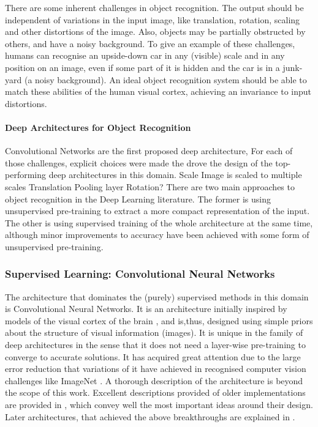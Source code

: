 \documentclass[a4paper]{report}
\begin{document}
		There are some inherent challenges in object recognition. The output should be independent of variations in the input image, like translation, rotation, scaling and other distortions of the image. Also, objects may be partially obstructed by others, and have a noisy background. To give an example of these challenges, humans can recognise an upside-down car in any (visible) scale and in any position on an image, even if some part of it is hidden and the car is in a junk-yard (a noisy background). An ideal object recognition system should be able to match these abilities of the human visual cortex, achieving an invariance to input distortions. 
		
		\paragraph{Deep Architectures for Object Recognition}
		Convolutional Networks are the first proposed deep architecture,
		For each of those challenges, explicit choices were made the drove the design of the top-performing deep architectures in this domain.
		Scale
			Image is scaled to multiple scales
		Translation
			Pooling layer
		Rotation?
		There are two main approaches to object recognition in the Deep Learning literature. The former is using unsupervised pre-training to extract a more compact representation of the input. The other is using supervised training of the whole architecture at the same time, although minor improvements to accuracy have been achieved with some form of unsupervised pre-training.
		\subsubsection{Supervised Learning: Convolutional Neural Networks}			
			The architecture that dominates the (purely) supervised methods in this domain is Convolutional Neural Networks. It is an architecture initially inspired by models of the visual cortex of the brain \cite{Fukushima1980}, and is,thus, designed using simple priors about the structure of visual information (images). It is unique in the family of deep architectures in the sense that it does not need a layer-wise pre-training to converge to accurate solutions. It has acquired great attention due to the large error reduction that variations of it have achieved in recognised computer vision challenges like ImageNet . A thorough description of the architecture is beyond the scope of this work. Excellent descriptions provided of older implementations are provided in \cite{LeCun1989,LeCun1990,Lecun1995} , which convey well the most important ideas around their design. Later architectures, that achieved the above breakthroughs are explained in \cite{Krizhevsky2012}.
						
\end{document}
